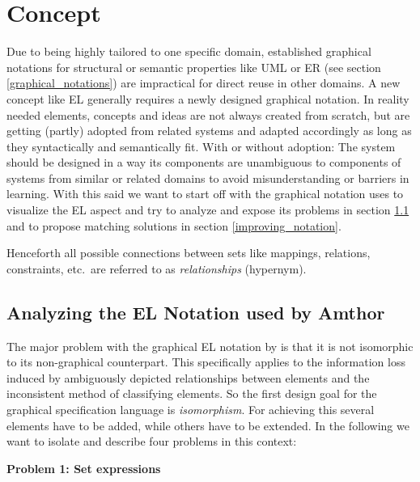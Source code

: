 \documentclass[twoside, openright, 12pt]{book}
\begin{document}
\section{Concept}
\label{gsl_concept}

Due to being highly tailored to one specific domain, established graphical notations for structural or semantic properties like UML or ER (see section \ref{graphical_notations}) are impractical for direct reuse in other domains.
A new concept like EL generally requires a newly designed graphical notation.
In reality needed elements, concepts and ideas are not always created from scratch, but are getting (partly) adopted from related systems and adapted accordingly as long as they syntactically and semantically fit.
With or without adoption: The system should be designed in a way its components are unambiguous to components of systems from similar or related domains to avoid misunderstanding or barriers in learning.
With this said we want to start off with the graphical notation \cite{Amthor18} uses to visualize the EL aspect and try to analyze and expose its problems in section \ref{analyzing_notation} and to propose matching solutions in section \ref{improving_notation}.

\begin{mdframed}[style=mystyle,frametitle=Note]
Henceforth all possible connections between sets like mappings, relations, constraints, etc.~are referred to as \textit{relationships} (hypernym).
\end{mdframed}



\subsection{Analyzing the EL Notation used by Amthor}
\label{analyzing_notation}
The major problem with the graphical EL notation by \cite{Amthor18} is that it is not isomorphic to its non-graphical counterpart.
This specifically applies to the information loss induced by ambiguously depicted relationships between elements and the inconsistent method of classifying elements.
So the first design goal for the graphical specification language is \textit{isomorphism}.
For achieving this several elements have to be added, while others have to be extended.
In the following we want to isolate and describe four problems in this context:

\vspace{6mm}
\noindent
\textbf{Problem 1: Set expressions}
\vspace{1mm}
\end{document}
